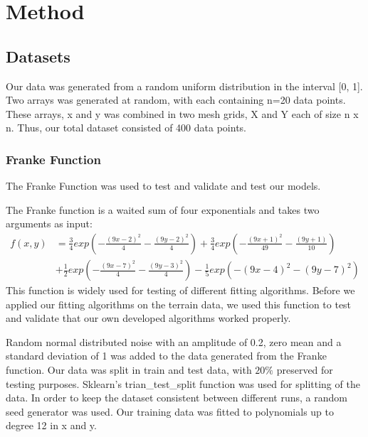\section{Method}



\subsection{Datasets}
Our data was generated from a random uniform distribution in the interval [0,
1]. Two arrays was generated at random, with each containing n=20 data points. 
These arrays, x and y was combined in two mesh grids, X and Y each of size n x n. Thus, our
total dataset consisted of 400 data points. 

\subsubsection{Franke Function}

The Franke Function was used to test and validate and test our models. 

The Franke function is a waited sum of four exponentials and takes two
arguments as input: 
\begin{align*}
    \label{eq:franke_function} 
    f(x,y) &= \frac{3}{4}exp\left(-\frac{(9x-2)^2}{4}-\frac{(9y-2)^2}{4} \right)
    + \frac{3}{4}exp\left(-\frac{(9x+1)^2}{49}-\frac{(9y+1)}{10} \right) \\
           &+ \frac{1}{2}exp\left(-\frac{(9x-7)^2}{4}-\frac{(9y-3)^2}{4}
           \right)-\frac{1}{5}exp(-(9x-4)^2-(9y-7)^2)
\end{align*}
This function is widely used for testing of different fitting algorithms. 
Before we applied our fitting algorithms on the terrain data, we used this function
to test and validate that our own developed algorithms worked properly.    

Random normal distributed noise with an amplitude of 0.2, zero mean and a
standard deviation of 1 was added to the data generated from the Franke
function. Our data was split in train and test data, with $20\%$ preserved for
testing purposes. Sklearn's trian\_test\_split function was used for splitting
of the data. In order to keep the dataset consistent between different runs, a
random seed generator was used. Our training data was fitted to polynomials up
to degree 12 in x and y. 



